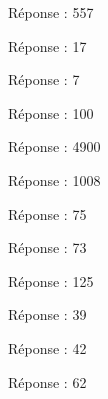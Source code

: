 \begin{sol}
Réponse : 557
\end{sol}

\begin{sol}
Réponse : 17
\end{sol}

\begin{sol}
Réponse : 7
\end{sol}

\begin{sol}
Réponse : 100
\end{sol}

\begin{sol}
Réponse : 4900
\end{sol}

\begin{sol}
Réponse : 1008
\end{sol}

\begin{sol}
Réponse : 75
\end{sol}

\begin{sol}
Réponse : 73
\end{sol}

\begin{sol}
Réponse : 125
\end{sol}

\begin{sol}
Réponse : 39
\end{sol}

\begin{sol}
Réponse : 42
\end{sol}

\begin{sol}
Réponse : 62
\end{sol}
